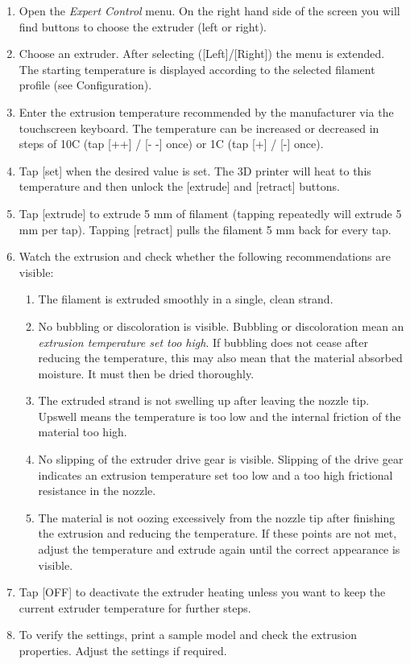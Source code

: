 \begin{enumerate}
  \item Open the \emph{Expert Control} menu.
        On the right hand side of the screen you will find buttons to choose the extruder (left or right).
  \item Choose an extruder.
        After selecting ([Left]/[Right]) the menu is extended. The starting temperature is displayed according to the selected filament profile (see Configuration).
  \item Enter the extrusion temperature recommended by the manufacturer via 
        the touchscreen keyboard. The temperature can be increased or decreased in steps of
        10\degree C (tap [++] / [- -] once) or 1\degree C (tap [+] / [-] once).
  \item Tap [set] when the desired value is set.
        The 3D printer will heat to this temperature and then unlock the [extrude] and [retract] buttons.
  \item Tap [extrude] to extrude 5 mm of filament 
        (tapping repeatedly will extrude 5 mm per tap). Tapping [retract] pulls the filament 5 mm back for every tap.
  \item Watch the extrusion and check whether the following recommendations are visible:
    \begin{enumerate}
      \item The filament is extruded smoothly in a single, clean strand.
      \item No bubbling or discoloration is visible. Bubbling or discoloration 
            mean an \emph{extrusion temperature set too high}.
            If bubbling does not cease after reducing the temperature, this may also mean that the material absorbed moisture. It must then be dried thoroughly.
      \item The extruded strand is not swelling up after leaving the nozzle tip. 
            Upswell means the temperature is too low and the internal friction of the material too high.
      \item No slipping of the extruder drive gear is visible. Slipping of the drive gear 
            indicates an extrusion temperature set too low and a too high frictional resistance in the nozzle.
      \item The material is not oozing excessively from the nozzle tip after 
            finishing the extrusion and reducing the temperature. \newline \newline
            If these points are not met, adjust the temperature and extrude again until the correct appearance is visible.
    \end{enumerate}
  \item Tap [OFF] to deactivate the extruder heating unless you want to keep the 
        current extruder temperature for further steps.
  \item To verify the settings, print a sample model and check the extrusion properties. 
        Adjust the settings if required.
\end{enumerate}


